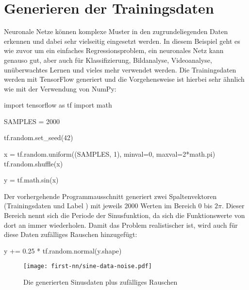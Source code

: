 \section{Generieren der Trainingsdaten}
Neuronale Netze können komplexe Muster in den zugrundeliegenden Daten erkennen
und dabei sehr vielseitig eingesetzt werden.
In diesem Beispiel geht es wie zuvor um ein einfaches Regressionsproblem,
ein neuronales Netz kann genauso gut, aber auch für
Klassifizierung, Bildanalyse, Videoanalyse,
unüberwachtes Lernen und vieles mehr verwendet werden.
Die Trainingsdaten werden mit TensorFlow generiert und
die Vorgehensweise ist hierbei sehr ähnlich
wie mit der Verwendung von NumPy:
\begin{pythoncode}
import tensorflow as tf
import math

SAMPLES = 2000

tf.random.set_seed(42)

x = tf.random.uniform((SAMPLES, 1), minval=0, maxval=2*math.pi)
tf.random.shuffle(x)

y = tf.math.sin(x)
\end{pythoncode}
Der vorhergehende Programmausschnitt generiert zwei Spaltenvektoren
(Trainingsdaten  und Label )
mit jeweils 2000 Werten im Bereich 0 bis $2\pi$.
Dieser Bereich nennt sich die Periode der Sinusfunktion,
da sich die Funktionswerte von dort an immer wiederholen.
Damit das Problem realistischer ist, wird auch für diese Daten
zufälliges Rauschen hinzugefügt:
\begin{pythoncode}
y += 0.25 * tf.random.normal(y.shape)
\end{pythoncode}
\begin{figure}[h!]
  \centering
  \texttt{[image: first-nn/sine-data-noise.pdf]}
  \caption{Die generierten Sinusdaten plus zufälliges Rauschen}
\end{figure}

